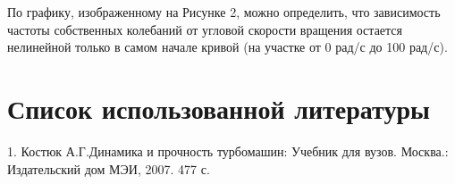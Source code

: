 По графику, изображенному на Рисунке 2, можно определить, что зависимость частоты собственных колебаний от угловой скорости вращения остается нелинейной только в самом начале кривой (на участке от 0 рад/с до 100 рад/с).

\section{Список использованной литературы}

1. Костюк А.Г.Динамика и прочность турбомашин: Учебник для вузов.  Москва.: Издательский дом МЭИ, 2007. 477 с.


